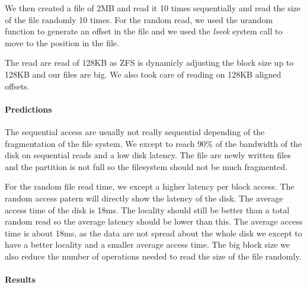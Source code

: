 We then created a file of 2MB and read it 10 times sequentially and read the
size of the file randomly 10 times.
For the random read, we used the urandom function to generate an offset in the
file and we used the \emph{lseek} system call to move to the position in the file.

The read are read of 128KB as ZFS is dynamicly adjusting the block size up to
128KB and our files are big.
We also took care of reading on 128KB aligned offsets.

\paragraph{Predictions}
The sequential access are usually not really sequential depending of the
fragmentation of the file system.
We except to reach 90\% of the bandwidth of the disk on sequential reads
and a low disk latency.
The file are newly written files and the partition is not full so the filesystem
should not be much fragmented.

For the random file read time, we except a higher latency per block access.
The random access patern will directly show the latency of the disk.
The average access time of the disk is 18ms.
The locality should still be better than a total random read so the average
latency should be lower than this.
The average access time is about 18ms, as the data are not spread about the
whole disk we except to have a better locality and a smaller average access
time.
The big block size we also reduce the number of operations needed to read the
size of the file randomly.

\paragraph{Results}

